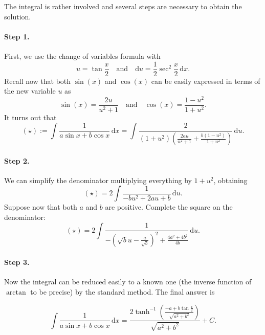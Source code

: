 \documentclass[a4paper,10 pt]{report}
\newcommand{\finalanswer}[1]{%
    \begin{finalAnswer}
    \[
        #1
    \]
    \end{finalAnswer}
}
\theoremstyle{definition}
\begin{document}
\begin{solutionBox} The integral is rather involved and several steps are necessary to obtain the solution.

\paragraph{Step 1.} First, we use the change of variables formula with
\begin{equation*} u = \tan \frac{x}{2} \quad \text{and} \quad \mathrm{d}u = \frac{1}{2} \sec^2 \frac{x}{2}\, \mathrm{d}x. \end{equation*}
Recall now that both $\sin(x)$ and $\cos(x)$ can be easily expressed in terms of the new variable $u$ as
\begin{equation*} \sin(x) = \frac{2u}{u^2+1} \quad \text{and} \quad \cos(x) = \frac{1 - u^2}{1 + u^2}. \end{equation*}
It turns out that
\begin{equation*}(\star) := \int  \frac{1}{a \sin x + b \cos x} \, \mathrm{d}x = \int \frac{2}{(1+ u^2) \left( \frac{2au}{u^2 + 1} + \frac{b(1 - u^2)}{1 + u^2} \right)} \, \mathrm{d}u. \end{equation*}

\paragraph{Step 2.} We can simplify the denominator multiplying everything by $1 + u^2$, obtaining
\begin{equation*}(\star) = 2 \int \frac{1}{- bu^2 + 2au + b} \, \mathrm{d}u. \end{equation*}
Suppose now that both $a$ and $b$ are positive. Complete the square on the denominator:
\begin{equation*}(\star) = 2 \int \frac{1}{ - \left( \sqrt{b}u - \frac{a}{\sqrt{b}} \right)^2 + \frac{4a^2 + 4b^2}{4b}} \, \mathrm{d}u. \end{equation*}

\paragraph{Step 3.} Now the integral can be reduced easily to a known one (the inverse function of $\arctan$ to be precise) by the standard method. The final answer is
\finalanswer{
\int \frac{1}{a \sin x + b \cos x} \, \mathrm{d}x = \frac{2 \tanh^{-1}\left( \frac{-a + b \tan \frac{x}{2}}{\sqrt{a^2 + b^2}} \right)}{\sqrt{a^2 + b^2}} + C.
}
\end{solutionBox}
\end{document}
